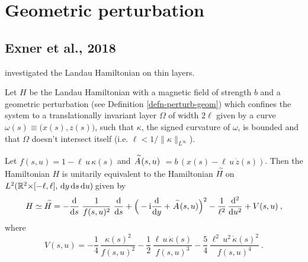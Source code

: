 


\section{Geometric perturbation}


\subsection{Exner et al., 2018}
\citet{Exner2018} investigated the Landau Hamiltonian on thin layers.

\begin{defn}
    Let $H\!$ be the Landau Hamiltonian with a magnetic field of strength $b$ and a geometric perturbation (see Definition \ref{defn-perturb-geom}) which confines the system to a translationally invariant layer $\Omega$ of width $2\ell$ given by a curve $\omega(s) \equiv \big(x(s),z(s)\big)$, such that $\kappa$, the signed curvature of $\omega$, is bounded and that $\Omega$ doesn't intersect itself (i.e. $\ell < 1/\lVert\kappa\rVert_{L^\infty}$).
\end{defn}

\begin{thm}
    Let $f(s,u) = 1 - \ell \, u \, \kappa(s)$ and $\overset{\;\,\scriptscriptstyle\sim}{A}(s,u) $ $ = b \,(x(s) - \ell \, u \, \dot z(s))$. Then the Hamiltonian $H\!$ is unitarily equivalent to the Hamiltonian $\overset{\;\,\scriptscriptstyle\sim}{H}\!$ on $L^2(\mathbb{R}^2 {\times} [-\ell, \ell], \, \mathrm{d}y \,\!\, \mathrm{d}s \,\!\, \mathrm{d}u \,\!)\!$ given by
    \begin{equation*}
        H \simeq \overset{\;\,\scriptscriptstyle\sim}{H}
        = - \frac{\mathrm{d} }{\mathrm{d} s} \; \frac{1}{f(s,u)^2} \; \frac{\mathrm{d} }{\mathrm{d} s}
        +  \Big( - \mathrm{i} \frac{\mathrm{d} }{\mathrm{d} y} + \overset{\;\,\scriptscriptstyle\sim}{A}(s,u) \Big)^2
        - \frac{1}{\ell^2} \, \frac{\mathrm{d} ^2}{\mathrm{d} u^2}
        + V(s,u)
        \: ,
    \end{equation*}
    where
    \begin{equation*}
        V(s,u)
        = -\frac{1}{4} \, \frac{\kappa(s)^2}{f(s,u)^2}
        - \frac{1}{2} \, \frac{\ell \, u \, \ddot\kappa(s)}{f(s,u)^3}
        - \frac{5}{4} \, \frac{\ell^2 \, u^2 \, \dot\kappa(s)^2}{f(s,u)^4}
        \: .
    \end{equation*}
\end{thm}

